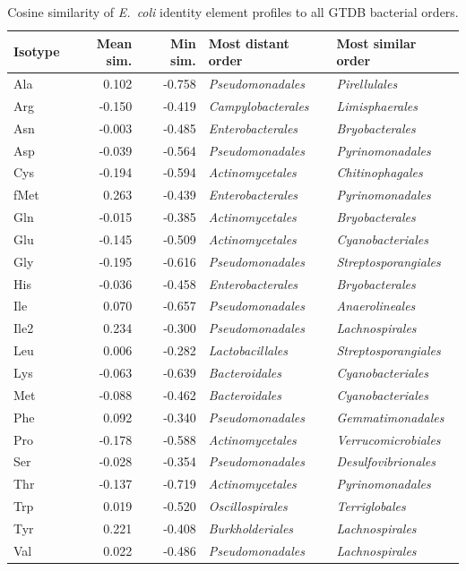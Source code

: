 \begin{table}[!ht]
\centering
\small
\caption{Cosine similarity of \textit{E.~coli} identity element profiles to all GTDB bacterial orders.}
\label{tab:ecoli_bacteria}
\begin{tabular}{lrrll}
\toprule
Isotype & Mean sim. & Min sim. & Most distant order & Most similar order \\
\midrule
  Ala & 0.102 & -0.758 & \textit{Pseudomonadales} & \textit{Pirellulales} \\
  Arg & -0.150 & -0.419 & \textit{Campylobacterales} & \textit{Limisphaerales} \\
  Asn & -0.003 & -0.485 & \textit{Enterobacterales} & \textit{Bryobacterales} \\
  Asp & -0.039 & -0.564 & \textit{Pseudomonadales} & \textit{Pyrinomonadales} \\
  Cys & -0.194 & -0.594 & \textit{Actinomycetales} & \textit{Chitinophagales} \\
  fMet & 0.263 & -0.439 & \textit{Enterobacterales} & \textit{Pyrinomonadales} \\
  Gln & -0.015 & -0.385 & \textit{Actinomycetales} & \textit{Bryobacterales} \\
  Glu & -0.145 & -0.509 & \textit{Actinomycetales} & \textit{Cyanobacteriales} \\
  Gly & -0.195 & -0.616 & \textit{Pseudomonadales} & \textit{Streptosporangiales} \\
  His & -0.036 & -0.458 & \textit{Enterobacterales} & \textit{Bryobacterales} \\
  Ile & 0.070 & -0.657 & \textit{Pseudomonadales} & \textit{Anaerolineales} \\
  Ile2 & 0.234 & -0.300 & \textit{Pseudomonadales} & \textit{Lachnospirales} \\
  Leu & 0.006 & -0.282 & \textit{Lactobacillales} & \textit{Streptosporangiales} \\
  Lys & -0.063 & -0.639 & \textit{Bacteroidales} & \textit{Cyanobacteriales} \\
  Met & -0.088 & -0.462 & \textit{Bacteroidales} & \textit{Cyanobacteriales} \\
  Phe & 0.092 & -0.340 & \textit{Pseudomonadales} & \textit{Gemmatimonadales} \\
  Pro & -0.178 & -0.588 & \textit{Actinomycetales} & \textit{Verrucomicrobiales} \\
  Ser & -0.028 & -0.354 & \textit{Pseudomonadales} & \textit{Desulfovibrionales} \\
  Thr & -0.137 & -0.719 & \textit{Actinomycetales} & \textit{Pyrinomonadales} \\
  Trp & 0.019 & -0.520 & \textit{Oscillospirales} & \textit{Terriglobales} \\
  Tyr & 0.221 & -0.408 & \textit{Burkholderiales} & \textit{Lachnospirales} \\
  Val & 0.022 & -0.486 & \textit{Pseudomonadales} & \textit{Lachnospirales} \\
\bottomrule
\end{tabular}
\end{table}


